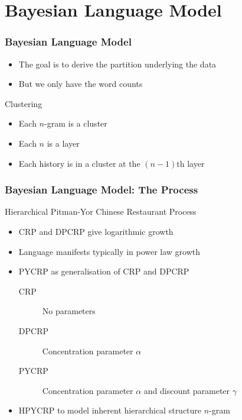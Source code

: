 \documentclass[11pt,t]{beamer}
\begin{document}
%
%    
%
%
\section{Bayesian Language Model}
\begin{frame}
    \frametitle{Bayesian Language Model}

    \begin{itemize}
        \item The goal is to derive the partition underlying the data
        \item But we only have the word counts
    \end{itemize}

    \begin{block}{Clustering}
        \begin{itemize}
            \item Each $n$-gram is a cluster
            \item Each $n$ is a layer
            \item Each history is in a cluster at the $(n-1)$th layer
        \end{itemize}
    \end{block}
\end{frame}

\begin{frame}
    \frametitle{Bayesian Language Model: The Process}
    \begin{block}{Hierarchical Pitman-Yor Chinese Restaurant Process}
        \begin{itemize}
            \item CRP and DPCRP give logarithmic growth
            \item Language manifests typically in power law growth
            \item PYCRP as generalisation of CRP and DPCRP
                \begin{description}
                    \item[CRP] No parameters
                    \item[DPCRP] Concentration parameter $\alpha$
                    \item[PYCRP] Concentration parameter $\alpha$ and discount parameter $\gamma$
                \end{description}
            \item HPYCRP to model inherent hierarchical structure $n$-gram
        \end{itemize}
    \end{block}
\end{frame}
\end{document}

